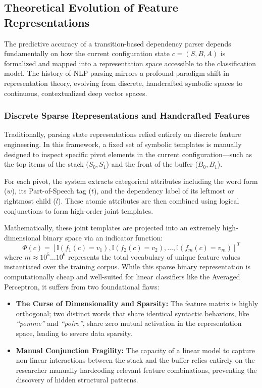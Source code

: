 \documentclass[12pt,a4paper]{article}
\begin{document}
\subsection{Theoretical Evolution of Feature Representations}
\label{subsec:feature_representations_theories}

The predictive accuracy of a transition-based dependency parser depends fundamentally on how the current configuration state $c = (S, B, A)$ is formalized and mapped into a representation space accessible to the classification model. The history of NLP parsing mirrors a profound paradigm shift in representation theory, evolving from discrete, handcrafted symbolic spaces to continuous, contextualized deep vector spaces.

\subsubsection{Discrete Sparse Representations and Handcrafted Features}
Traditionally, parsing state representations relied entirely on discrete feature engineering. In this framework, a fixed set of symbolic templates is manually designed to inspect specific pivot elements in the current configuration—such as the top items of the stack ($S_0, S_1$) and the front of the buffer ($B_0, B_1$). 

For each pivot, the system extracts categorical attributes including the word form ($w$), its Part-of-Speech tag ($t$), and the dependency label of its leftmost or rightmost child ($l$). These atomic attributes are then combined using logical conjunctions to form high-order joint templates. 

Mathematically, these joint templates are projected into an extremely high-dimensional binary space via an indicator function:
\begin{equation}
    \Phi(c) = [\mathbb{I}(f_1(c) = v_1), \mathbb{I}(f_2(c) = v_2), \dots, \mathbb{I}(f_m(c) = v_m)]^T
\end{equation}
where $m \approx 10^5 \dots 10^6$ represents the total vocabulary of unique feature values instantiated over the training corpus. While this sparse binary representation is computationally cheap and well-suited for linear classifiers like the Averaged Perceptron, it suffers from two foundational flaws:
\begin{itemize}
    \item \textbf{The Curse of Dimensionality and Sparsity:} The feature matrix is highly orthogonal; two distinct words that share identical syntactic behaviors, like \textit{``pomme''} and \textit{``poire''}, share zero mutual activation in the representation space, leading to severe data sparsity.
    \item \textbf{Manual Conjunction Fragility:} The capacity of a linear model to capture non-linear interactions between the stack and the buffer relies entirely on the researcher manually hardcoding relevant feature combinations, preventing the discovery of hidden structural patterns.
\end{itemize}
\end{document}
